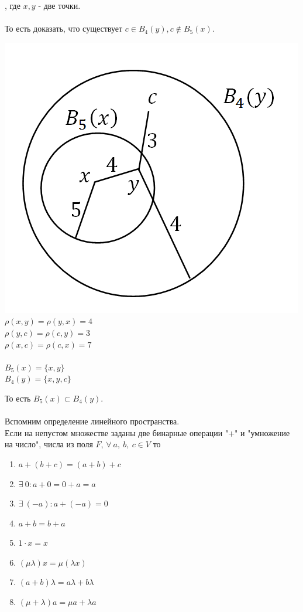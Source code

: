 \documentclass[12pt]{article}
\theoremstyle{definition}
\numberwithin{equation}{section}
\begin{document}
	, где $x, y$ - две точки. \\ \\То есть доказать, что существует $c\in B_4(y), c\notin B_5(x)$.\begin{center}
		\includegraphics[scale=0.5]{l4_5.png}\\
		$\rho (x, y) = \rho(y, x) = 4$\\
		$\rho (y, c) = \rho(c, y) = 3$\\
		$\rho (x, c) = \rho(c, x) = 7$\\
		~\\
		$B_5(x) = \{ x, y \}$\\
		$B_4(y) = \{x, y, c \} $\end{center}
	То есть $B_5(x) \subset B_4(y)$.\\
	\\
	Вспомним определение линейного пространства.\\
	Если на непустом множестве заданы две бинарные операции "+" и "умножение на число", числа из поля $F$, $\forall ~a,~b,~c\in V$ то\begin{enumerate}
		\item $a+(b+c) = (a+b)+c$
		\item $\exists~0: a+0 = 0+a = a$
		\item $\exists~ (-a): a+(-a) = 0$
		\item $a+b = b+a$
		\item $1\cdot x = x$
		\item $ (\mu \lambda)x = \mu(\lambda x)$
		\item $(a+b)\lambda = a\lambda + b\lambda$
		\item $(\mu + \lambda)a = \mu a + \lambda a$
	\end{enumerate}
\end{document}
